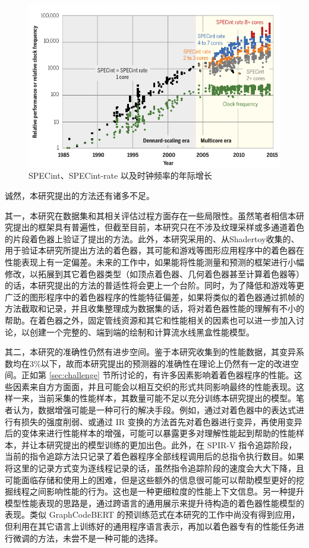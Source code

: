 \begin{figure}
    \centering
    \includegraphics{figures/SPECint.pdf}
    \caption{SPECint、SPECint-rate 以及时钟频率的年际增长 \cite{doi:10.1126/science.aam9744}}
    \label{fig:specint}
\end{figure}

诚然，本研究提出的方法还有诸多不足。

其一，本研究在数据集和其相关评估过程方面存在一些局限性。虽然笔者相信本研究提出的框架具有普遍性，但截至目前，本研究只在不涉及纹理采样或多通道着色的片段着色器上验证了提出的方法。此外，本研究采用的、从Shadertoy收集的、用于验证本研究所提出方法的着色器，其可能和游戏等图形应用程序中的着色器在性能表现上有一定偏差。未来的工作中，如果能将性能测量和预测的框架进行小幅修改，以拓展到其它着色器类型（如顶点着色器、几何着色器甚至计算着色器等）的话，本研究提出的方法的普适性将会更上一个台阶。同时，为了降低和游戏等更广泛的图形程序中的着色器程序的性能特征偏差，如果将类似的着色器通过抓帧的方法截取和记录，并且收集整理成为数据集的话，将对着色器性能的理解有不小的帮助。在着色器之外，固定管线资源和其它和性能相关的因素也可以进一步加入讨论，以创建一个完整的、端到端的绘制和计算流水线黑盒性能模型。

其二，本研究的准确性仍然有进步空间。鉴于本研究收集到的性能数据，其变异系数均在3\%以下，故而本研究提出的预测器的准确性在理论上仍然有一定的改进空间。正如第 \ref{sec:challenge} 节所讨论的，有许多因素影响着着色器程序的性能。这些因素来自方方面面，并且可能会以相互交织的形式共同影响最终的性能表现。这样一来，当前采集的性能样本，其数量可能不足以充分训练本研究提出的模型。笔者认为，数据增强可能是一种可行的解决手段。例如，通过对着色器中的表达式进行有损失的强度削弱、或通过 IR 变换的方法首先对着色器进行变异，再使用变异后的变体来进行性能样本的增强，可能可以暴露更多对理解性能起到帮助的性能样本，并让本研究提出的模型训练的更加出色。此外，在 SPIR-V 指令追踪阶段，当前的指令追踪方法只记录了着色器程序全部线程调用后的总指令执行数目。如果将这里的记录方式变为逐线程记录的话，虽然指令追踪阶段的速度会大大下降，且可能面临存储和使用上的困难，但是这些额外的信息很可能可以帮助模型更好的挖掘线程之间影响性能的行为。这也是一种更细粒度的性能上下文信息。另一种提升模型性能表现的思路是，通过跨语言的通用展示来提升待构造的着色器性能模型的表现。类似 GraphCodeBERT \cite{DBLP:conf/iclr/GuoRLFT0ZDSFTDC21}的预训练范式在本研究的工作中尚没有得到应用，但利用在其它语言上训练好的通用程序语言表示，再加以着色器专有的性能任务进行微调的方法，未尝不是一种可能的选择。

